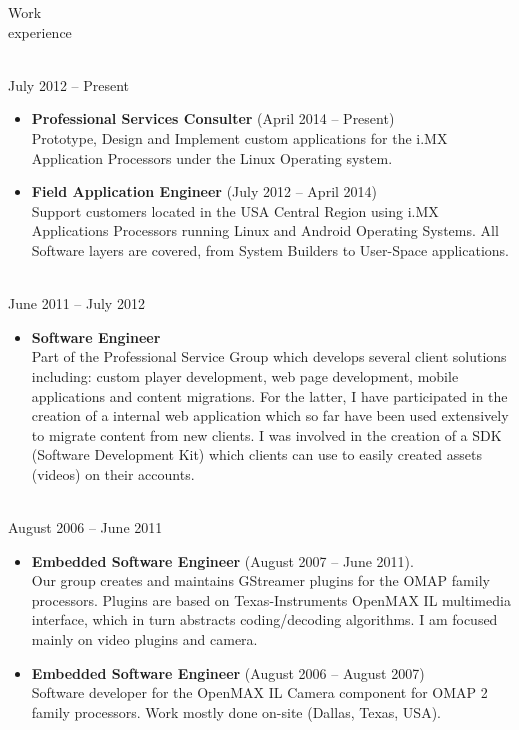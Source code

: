 \documentclass{resume}
\begin{document}
\begin{category}{Work \\experience}


\\
July 2012 -- Present
\begin{itemize}
\item \textbf{Professional Services Consulter} (April 2014 -- Present)\\
Prototype, Design and Implement custom applications for the i.MX
Application Processors under the Linux Operating system.
\end{itemize}

\begin{itemize}
\item \textbf{Field Application Engineer} (July 2012 -- April 2014)\\
Support customers located in the USA Central Region using i.MX Applications Processors running Linux and Android Operating Systems. All Software layers are covered, from System Builders to User-Space applications. \end{itemize}

\\
June 2011 -- July 2012
\begin{itemize}
\item \textbf{Software Engineer}\\
Part of the Professional Service Group which develops several client solutions including: 
custom player development, web page development, mobile applications and content migrations.
For the latter, I have participated in the creation of a internal web application which so 
far have been used extensively to migrate content from new clients. I was involved in the creation of a SDK (Software Development Kit) which clients can use to easily created assets (videos) on their accounts.
\end{itemize}

\\
August 2006 -- June 2011
\begin{itemize}
\item \textbf{Embedded Software Engineer} (August 2007 -- June 2011).\\
Our group creates and maintains GStreamer plugins for the OMAP family processors. Plugins are based on Texas-Instruments OpenMAX IL multimedia interface,
which in turn abstracts coding/decoding algorithms. I am focused mainly on video plugins and camera.\\
\item \textbf{Embedded Software Engineer} (August 2006 -- August 2007)\\
Software developer for the OpenMAX IL Camera component for OMAP 2 family processors. Work mostly done on-site (Dallas, Texas, USA).\\
\end{itemize}
\end{category}
\end{document}
